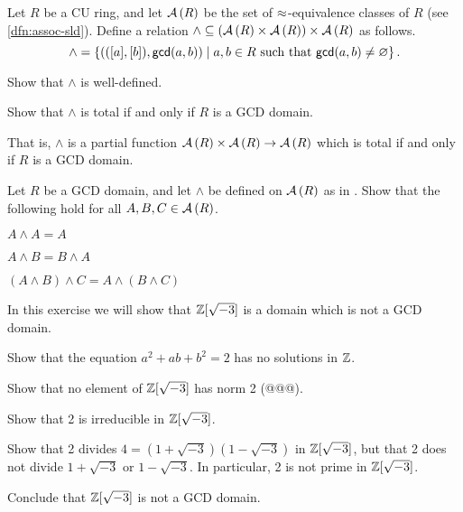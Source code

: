 \begin{exercise} \label{exerc:gcd-meet}
Let \(R\) be a CU ring, and let \( \mathcal{A}\left(R\right) \) be the set of \(\approx\)-equivalence classes of \(R\) (see \ref{dfn:assoc-sld}).
Define a relation \(\wedge \subseteq ( \mathcal{A}\left(R\right)  \times  \mathcal{A}\left(R\right) ) \times  \mathcal{A}\left(R\right) \) as follows.
\[ \wedge = \left\{ \left(([a],[b]), \mathsf{gcd}(a, b)\right) \mid a,b \in R\ \mathrm{such\ that}\ \mathsf{gcd}(a, b) \neq \varnothing \right\}. \]
\begin{proplist}
\item Show that \(\wedge\) is well-defined.
\item Show that \(\wedge\) is total if and only if \(R\) is a GCD domain.
\end{proplist}
That is, \(\wedge\) is a partial function \( \mathcal{A}\left(R\right)  \times  \mathcal{A}\left(R\right)  \rightarrow  \mathcal{A}\left(R\right) \) which is total if and only if \(R\) is a GCD domain.
\end{exercise}

\begin{exercise}
Let \(R\) be a GCD domain, and let \(\wedge\) be defined on \( \mathcal{A}\left(R\right) \) as in .
Show that the following hold for all \(A,B,C \in  \mathcal{A}\left(R\right) \).
\begin{proplist*}
\item \(A \wedge A = A\)
\item \(A \wedge B = B \wedge A\)
\item \((A \wedge B) \wedge C = A \wedge (B \wedge C)\)
\end{proplist*}
\end{exercise}

\begin{exercise} In this exercise we will show that \(\mathbb{Z}[\sqrt{-3}]\) is a domain which is not a GCD domain.
\begin{proplist}
\item Show that the equation \(a^2 + ab + b^2 = 2\) has no solutions in \(\mathbb{Z}\).
\item Show that no element of \(\mathbb{Z}[\sqrt{-3}]\) has norm 2 (@@@).
\item Show that 2 is irreducible in \(\mathbb{Z}[\sqrt{-3}]\).
\item Show that 2 divides \(4 = (1 + \sqrt{-3})(1 - \sqrt{-3})\) in \(\mathbb{Z}[\sqrt{-3}]\), but that 2 does not divide \(1 + \sqrt{-3}\) or \(1 - \sqrt{-3}\).
In particular, 2 is not prime in \(\mathbb{Z}[\sqrt{-3}]\).
\item Conclude that \(\mathbb{Z}[\sqrt{-3}]\) is not a GCD domain.
\end{proplist}
\end{exercise}

